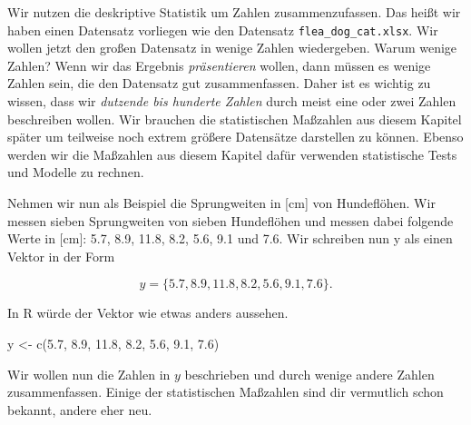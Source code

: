 \documentclass[
  letterpaper,
  DIV=11,
  oneside]{scrreport}
\newenvironment{Shaded}{\begin{snugshade}}{\end{snugshade}}
\newcommand{\FloatTok}[1]{\textcolor[rgb]{0.68,0.00,0.00}{#1}}
\newcommand{\FunctionTok}[1]{\textcolor[rgb]{0.28,0.35,0.67}{#1}}
\newcommand{\NormalTok}[1]{\textcolor[rgb]{0.00,0.23,0.31}{#1}}
\newcommand{\OtherTok}[1]{\textcolor[rgb]{0.00,0.23,0.31}{#1}}
\begin{document}
{}

Wir nutzen die deskriptive Statistik um Zahlen zusammenzufassen. Das
heißt wir haben einen Datensatz vorliegen wie den Datensatz
\texttt{flea\_dog\_cat.xlsx}. Wir wollen jetzt den großen Datensatz in
wenige Zahlen wiedergeben. Warum wenige Zahlen? Wenn wir das Ergebnis
\emph{präsentieren} wollen, dann müssen es wenige Zahlen sein, die den
Datensatz gut zusammenfassen. Daher ist es wichtig zu wissen, dass wir
\emph{dutzende bis hunderte Zahlen} durch meist eine oder zwei Zahlen
beschreiben wollen. Wir brauchen die statistischen Maßzahlen aus diesem
Kapitel später um teilweise noch extrem größere Datensätze darstellen zu
können. Ebenso werden wir die Maßzahlen aus diesem Kapitel dafür
verwenden statistische Tests und Modelle zu rechnen.

Nehmen wir nun als Beispiel die Sprungweiten in {[}cm{]} von
Hundeflöhen. Wir messen sieben Sprungweiten von sieben Hundeflöhen und
messen dabei folgende Werte in {[}cm{]}: 5.7, 8.9, 11.8, 8.2, 5.6, 9.1
und 7.6. Wir schreiben nun y als einen Vektor in der Form

\[
y = \{5.7, 8.9, 11.8, 8.2, 5.6, 9.1, 7.6\}.
\]

In R würde der Vektor wie etwas anders aussehen.

\begin{Shaded}
\begin{Highlighting}[]
\NormalTok{y }\OtherTok{\textless{}{-}} \FunctionTok{c}\NormalTok{(}\FloatTok{5.7}\NormalTok{, }\FloatTok{8.9}\NormalTok{, }\FloatTok{11.8}\NormalTok{, }\FloatTok{8.2}\NormalTok{, }\FloatTok{5.6}\NormalTok{, }\FloatTok{9.1}\NormalTok{, }\FloatTok{7.6}\NormalTok{) }
\end{Highlighting}
\end{Shaded}

Wir wollen nun die Zahlen in \(y\) beschrieben und durch wenige andere
Zahlen zusammenfassen. Einige der statistischen Maßzahlen sind dir
vermutlich schon bekannt, andere eher neu.
\end{document}
